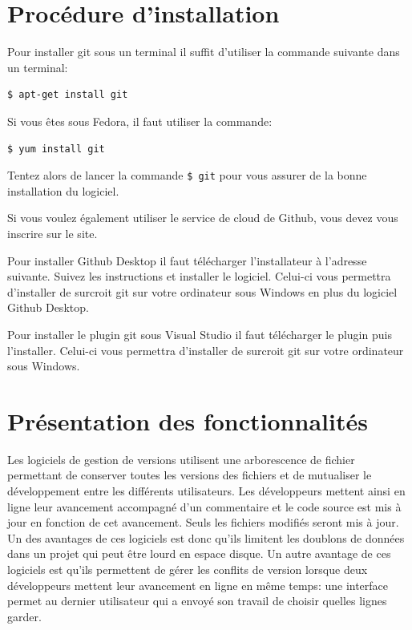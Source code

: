 \section{Procédure d’installation}

Pour installer git sous un terminal il suffit  d’utiliser la commande suivante dans un terminal:
\begin{verbatim}
$ apt-get install git
\end{verbatim}

Si vous êtes sous Fedora, il faut utiliser la commande:
\begin{verbatim}
$ yum install git
\end{verbatim}

\noindent Tentez alors de lancer la commande \texttt{\$ git} pour vous assurer de la bonne installation du logiciel.

Si vous voulez également utiliser le service de cloud de Github, vous devez vous inscrire sur le site.

Pour installer Github Desktop il faut télécharger l’installateur à l’adresse suivante. Suivez les instructions et installer le logiciel. Celui-ci vous permettra d’installer de surcroit git sur votre ordinateur sous Windows en plus du logiciel Github Desktop.

Pour installer le plugin git sous Visual Studio il faut télécharger le plugin puis l’installer. Celui-ci vous permettra d’installer de surcroit git sur votre ordinateur sous Windows.

\section{Présentation des fonctionnalités}

Les logiciels de gestion de versions utilisent une arborescence de fichier permettant de conserver toutes les versions des fichiers et de mutualiser le développement entre les différents utilisateurs. Les développeurs mettent ainsi en ligne leur avancement accompagné d’un commentaire et le code source est mis à jour en fonction de cet avancement. Seuls les fichiers modifiés seront mis à jour. Un des avantages de ces logiciels est donc qu’ils limitent les doublons de données dans un projet qui peut être lourd en espace disque. Un autre avantage de ces logiciels est qu’ils permettent de gérer les conflits de version lorsque deux développeurs mettent leur avancement en ligne en même temps: une interface permet au dernier utilisateur qui a envoyé son travail de choisir quelles lignes garder.

